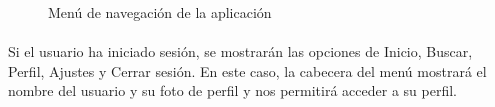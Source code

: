 \documentclass[a4paper,12pt]{report}
\begin{document}
\begin{minipage}{0.27\textwidth}
\begin{figure}[H]
          \caption{Menú de navegación de la aplicación}
          \label{fig:menu-navegacion}
        \end{figure}
      \end{minipage}
      \begin{minipage}{0.6\textwidth}
        \paragraph*{}{
          Si el usuario ha iniciado sesión, se mostrarán las opciones de Inicio, Buscar, Perfil, Ajustes y Cerrar sesión. En este caso, la cabecera del menú mostrará el nombre del usuario y su foto de perfil y nos permitirá acceder a su perfil.
        }
      \end{minipage}
      \hfill
      \begin{minipage}{0.27\textwidth}
        \begin{figure}[H]
          \centering

\end{figure}
\end{minipage}
\end{document}
